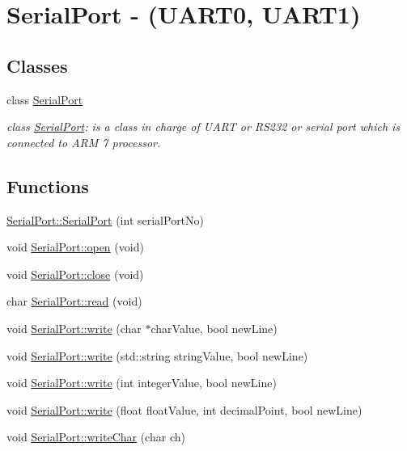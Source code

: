 \hypertarget{group__group8}{
\section{SerialPort -\/ (UART0, UART1)}
\label{d1/d95/group__group8}
}
\subsection*{Classes}
\begin{DoxyCompactItemize}
\item 
class \hyperlink{class_serial_port}{SerialPort}
\begin{DoxyCompactList}\small\item\em class \hyperlink{class_serial_port}{SerialPort}: is a class in charge of UART or RS232 or serial port which is connected to ARM 7 processor. \end{DoxyCompactList}\end{DoxyCompactItemize}
\subsection*{Functions}
\begin{DoxyCompactItemize}
\item 
\hyperlink{group__group8_gaa95a052574086564644915c26aa42159}{SerialPort::SerialPort} (int serialPortNo)
\item 
void \hyperlink{group__group8_ga6d80380bb3415a1ee4355ffcec98773c}{SerialPort::open} (void)
\item 
void \hyperlink{group__group8_gaabba6d6f25800b197cee28ed8e605f2a}{SerialPort::close} (void)
\item 
char \hyperlink{group__group8_gaa38a0c0f839a8bf27786ac86d8ca525b}{SerialPort::read} (void)
\item 
void \hyperlink{group__group8_gae48d12719fd7e1e2b0e35f127a5006bf}{SerialPort::write} (char $\ast$charValue, bool newLine)
\item 
void \hyperlink{group__group8_ga93f70c8ee96c97eee2d31df578bdf51e}{SerialPort::write} (std::string stringValue, bool newLine)
\item 
void \hyperlink{group__group8_gad981db5bddd0681367480c272c87fb38}{SerialPort::write} (int integerValue, bool newLine)
\item 
void \hyperlink{group__group8_gab50edcebab73bfe52b729f677dd61636}{SerialPort::write} (float floatValue, int decimalPoint, bool newLine)
\item 
void \hyperlink{group__group8_gaa3dd171551bd6b38d949768f5cb335f2}{SerialPort::writeChar} (char ch)
\end{DoxyCompactItemize}


